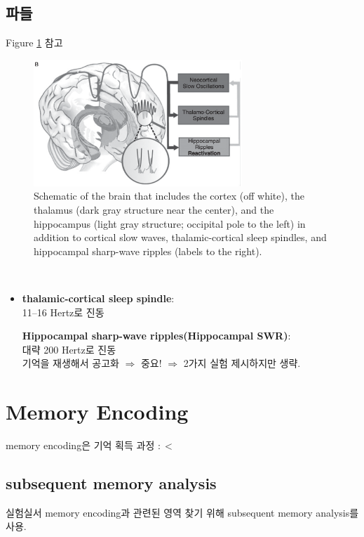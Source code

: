 \documentclass[../note.tex]{subfiles}
\begin{document}
\begin{itemize}
\subsection{파들}
Figure \ref{fig:waves} 참고

\begin{figure}[htbp]
  \centering
  \includegraphics[width=0.7\textwidth]{image/waves}
  \caption{Schematic of the brain that
includes the cortex (off white), the thalamus (dark gray structure near the center), and the
hippocampus (light gray structure; occipital pole to the left) in addition to cortical slow waves,
thalamic-cortical sleep spindles, and hippocampal sharp-wave ripples (labels to the right).}
  \label{fig:waves}
\end{figure}\\

\begin{itemize}
  \item\textbf{thalamic-cortical sleep spindle}:\\
    11–16 Hertz로 진동

  \itme\textbf{Hippocampal sharp-wave ripples(Hippocampal SWR)}:\\
    대략 200 Hertz로 진동\\
    기억을 재생해서 공고화 $\Rightarrow$ 중요! $\Longrightarrow$ 2가지 실험 제시하지만 생략.
\end{itemize}

\section{Memory Encoding}
memory encoding은 기억 획득 과정 $:<$

\subsection{subsequent memory analysis}
실험실서 memory encoding과 관련된 영역 찾기 위해 subsequent memory analysis를 사용.


\end{itemize}
\end{document}
